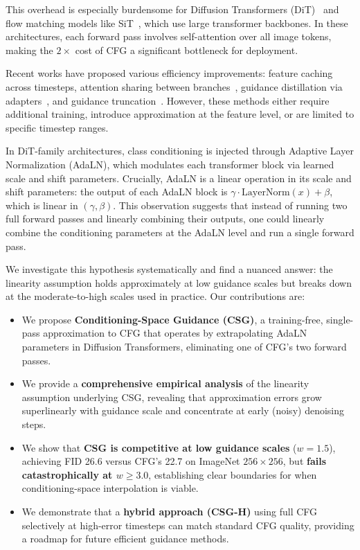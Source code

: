 \documentclass{article}
\newcommand{\adaln}{AdaLN}
\begin{document}
This overhead is especially burdensome for Diffusion Transformers (DiT)~\citep{peebles2023scalable} and flow matching models like SiT~\citep{ma2024sit}, which use large transformer backbones. In these architectures, each forward pass involves self-attention over all image tokens, making the $2\times$ cost of CFG a significant bottleneck for deployment.

Recent works have proposed various efficiency improvements: feature caching across timesteps, attention sharing between branches~\citep{zheng2024ditfastattn}, guidance distillation via adapters~\citep{phan2025efficient}, and guidance truncation~\citep{kynkaanniemi2024applying}. However, these methods either require additional training, introduce approximation at the feature level, or are limited to specific timestep ranges.

In DiT-family architectures, class conditioning is injected through Adaptive Layer Normalization (\adaln{}), which modulates each transformer block via learned scale and shift parameters. Crucially, \adaln{} is a linear operation in its scale and shift parameters: the output of each \adaln{} block is $\gamma \cdot \mathrm{LayerNorm}(x) + \beta$, which is linear in $(\gamma, \beta)$. This observation suggests that instead of running two full forward passes and linearly combining their outputs, one could linearly combine the conditioning parameters at the \adaln{} level and run a single forward pass.

We investigate this hypothesis systematically and find a nuanced answer: the linearity assumption holds approximately at low guidance scales but breaks down at the moderate-to-high scales used in practice. Our contributions are:

\begin{itemize}
    \item We propose \textbf{Conditioning-Space Guidance (CSG)}, a training-free, single-pass approximation to CFG that operates by extrapolating \adaln{} parameters in Diffusion Transformers, eliminating one of CFG's two forward passes.
    \item We provide a \textbf{comprehensive empirical analysis} of the linearity assumption underlying CSG, revealing that approximation errors grow superlinearly with guidance scale and concentrate at early (noisy) denoising steps.
    \item We show that \textbf{CSG is competitive at low guidance scales} ($w = 1.5$), achieving FID 26.6 versus CFG's 22.7 on ImageNet $256\times 256$, but \textbf{fails catastrophically at $w \geq 3.0$}, establishing clear boundaries for when conditioning-space interpolation is viable.
    \item We demonstrate that a \textbf{hybrid approach (CSG-H)} using full CFG selectively at high-error timesteps can match standard CFG quality, providing a roadmap for future efficient guidance methods.
\end{itemize}
\end{document}
